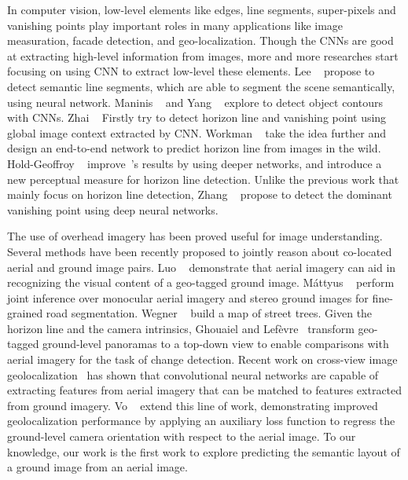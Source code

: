 
In computer vision, low-level elements like edges, line segments,
super-pixels and vanishing points play important roles in many
applications like image measuration, facade detection, and
geo-localization.
Though the CNNs are good at extracting high-level information from
images, more and more researches start focusing on using CNN to
extract low-level these elements.
%
Lee \etal~\cite{lee2017semantic} propose to detect semantic line
segments, which are able to segment the scene semantically, using
neural network. Maninis \etal~\cite{maninis2016convolutional} and Yang
\etal~\cite{yang2016object} explore to detect object contours with
CNNs.
%
Zhai \etal~\cite{zhai2016horizon} Firstly try to detect horizon
line and vanishing point using global image context extracted by CNN.
Workman \etal~\cite{workman2016horizon} take the idea further and
design an end-to-end network to predict horizon line from images
in the wild. 
Hold-Geoffroy \etal~\cite{hold2017perceptual}
improve~\cite{workman2016horizon}'s results by using deeper networks,
and introduce a new perceptual measure for horizon line detection.
Unlike the previous work that mainly focus on horizon line detection,
Zhang \etal~\cite{zhang2018dominant} propose to detect the dominant
vanishing point using deep neural networks.


The use of overhead imagery has been proved useful for image
understanding.
Several methods have been recently proposed to jointly reason about
co-located aerial and ground image pairs. Luo
\etal~\cite{luo2008event} demonstrate that aerial imagery can aid
in recognizing the visual content of a geo-tagged ground image.
M{\'a}ttyus \etal~\cite{mattyus2016hd} perform joint inference over
monocular aerial imagery and stereo ground images for fine-grained
road segmentation. Wegner \etal~\cite{wegner2016cataloging} build a
map of street trees. Given the horizon line and the camera intrinsics,
Ghouaiel and Lef{\`e}vre~\cite{ghouaiel2016coupling} transform
geo-tagged ground-level panoramas to a top-down view to enable
comparisons with aerial imagery for the task of change detection.
Recent work on cross-view image
geolocalization~\cite{lin2013cross,lin2015learning,workman2015geocnn,workman2015wide}
 has shown that convolutional neural
networks are capable of extracting features from aerial imagery
that can be matched to features extracted from ground imagery.
Vo \etal~\cite{vo2016localizing} extend this line of work,
demonstrating improved geolocalization performance by applying an
auxiliary loss function to regress the ground-level camera orientation
with respect to the aerial image. To our knowledge, our work is the
first work to explore predicting the semantic layout of a ground
image from an aerial image.

